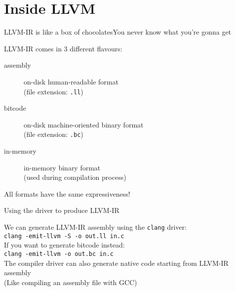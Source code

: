
\section{Inside LLVM}


\begin{frame}{LLVM-IR is like a box of chocolates}{You never know what you're gonna get}
\begin{center}
LLVM-IR comes in 3 different flavours:
\end{center}
\bigskip
\begin{description}
\item[assembly] on-disk human-readable format\\(file extension: \texttt{.ll})
\item[bitcode] on-disk machine-oriented binary format\\(file extension: \texttt{.bc})
\item[in-memory] in-memory binary format\\(used during compilation process)
\end{description}
\bigskip
\begin{center}
All formats have the same expressiveness!
\end{center}
\vfill
\end{frame}


\begin{frame}{Using the driver to produce LLVM-IR}
\begin{center}
\vfill
We can generate LLVM-IR assembly using the \texttt{clang} driver:\\
\bigskip
\texttt{clang -emit-llvm -S -o out.ll in.c}\\
\medskip
{\footnotesize If you want to generate bitcode instead:\\
\texttt{clang -emit-llvm -o out.bc in.c}\\
}
\bigskip
The compiler driver can also generate native code starting from 
LLVM-IR assembly\\
\smallskip
{\small(Like compiling an assembly file with GCC)}
\vfill
\end{center}
\end{frame}


